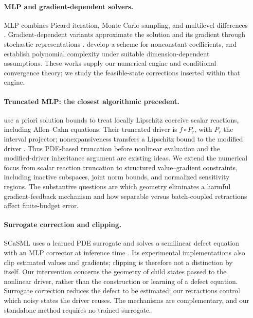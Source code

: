 \documentclass{article}
\begin{document}
\paragraph{MLP and gradient-dependent solvers.}
MLP combines Picard iteration, Monte Carlo sampling, and multilevel differences \citep{E2021}. Gradient-dependent variants approximate the solution and its gradient through stochastic representations \citep{HutzenthalerKruse2020,HutzenthalerJentzenKruse2022}. \citet{NeufeldWu2025} develop a scheme for nonconstant coefficients, and \citet{NeufeldNguyenWu2025} establish polynomial complexity under suitable dimension-dependent assumptions. These works supply our numerical engine and conditional convergence theory; we study the feasible-state corrections inserted within that engine.

\paragraph{Truncated MLP: the closest algorithmic precedent.}
\citet{Beck2020} use a priori solution bounds to treat locally Lipschitz coercive scalar reactions, including Allen--Cahn equations. Their truncated driver is $f\circ P_r$, with $P_r$ the interval projector; nonexpansiveness transfers a Lipschitz bound to the modified driver \citep[Eq.~(76), Lemma~3.2]{Beck2020}. Thus PDE-based truncation before nonlinear evaluation and the modified-driver inheritance argument are existing ideas. We extend the numerical focus from scalar reaction truncation to structured value--gradient constraints, including inactive subspaces, joint norm bounds, and normalized sensitivity regions. The substantive questions are which geometry eliminates a harmful gradient-feedback mechanism and how separable versus batch-coupled retractions affect finite-budget error.

\paragraph{Surrogate correction and clipping.}
SCaSML uses a learned PDE surrogate and solves a semilinear defect equation with an MLP corrector at inference time \citep{Fan2026}. Its experimental implementations also clip estimated values and gradients; clipping is therefore not a distinction by itself. Our intervention concerns the geometry of child states passed to the nonlinear driver, rather than the construction or learning of a defect equation. Surrogate correction reduces the defect to be estimated; our retractions control which noisy states the driver reuses. The mechanisms are complementary, and our standalone method requires no trained surrogate.
\end{document}
